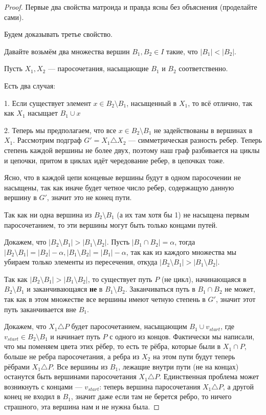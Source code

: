\begin{proof}
  Первые два свойства матроида и правда ясны без объяснения (проделайте сами).

  Будем доказывать третье свойство.

  Давайте возьмём два множества вершин $B_1, B_2 \in I$ такие, что $|B_1| < |B_2|$.

  Пусть $X_1, X_2$ --- паросочетания, насыщающие $B_1$ и $B_2$ 
  соответственно.

  Есть два случая:

  1. Если существует элемент $x \in B_2 \setminus B_1$, насыщенный в $X_1$, то всё
  отлично, так как $X_1$ насыщает $B_1 \cup x$ 

  2. Теперь мы предполагаем, что все $x \in B_2 \setminus B_1$ не задействованы
  в вершинах в $X_1$. Рассмотрим подграф $G' = X_1 \triangle X_2$ --- 
  симметрическая разность ребер. Теперь степень каждой вершины не более двух, поэтому
  наш граф разбивается на циклы и цепочки, притом в циклах идёт чередование ребер,
  в цепочках тоже.

  Ясно, что в каждой цепи концевые вершины будут в одном паросочении не насыщены, так
  как иначе будет 
  четное число ребер, содержащую данную вершину в $G'$, значит это не конец пути.

  Так как ни одна вершина из $B_2 \setminus B_1$ (а их там хотя бы 1) не насыщена
  первым паросочетанием, то эти вершины могут быть только концами путей.

  Докажем, что $|B_2 \setminus B_1| > |B_1 \setminus B_2|$. Пусть $|B_1 \cap B_2| 
  = \alpha$, тогда $|B_2 \setminus B_1| = |B_2| - \alpha, |B_1 \setminus B_2| = 
  |B_1| - \alpha$, так как из каждого множества мы убираем только элементы из 
  пересечения, откуда $|B_2 \setminus B_1| > |B_1 \setminus B_2|$.

  Так как $|B_2 \setminus B_1| > |B_1 \setminus B_2|$, то существует путь $P$ (не
  цикл),
  начинающаяся в $B_2 \setminus B_1$ и заканчивающаяся {\bf не} в $B_1 \setminus
  B_2$. Заканчиваться путь в $B_1 \cap B_2$ не может, так как в этом множестве все
  вершины имеют четную степень в $G'$, значит этот путь заканчивается вне $B_1$.

  Докажем, что $X_1 \triangle P$ будет паросочетанием, насыщающим 
  $B_1 \cup v_{start}$, где $v_{start} \in B_2 \setminus B_1$ и начинает путь 
  $P$ с одного из концов. Фактически мы написали, что мы поменяем цвета этих
  рёбер, то есть те рёбра, которые были в $X_1 \cap P$, больше не ребра паросочетания,
  а ребра из $X_2$ на этом пути будут теперь рёбрами $X_1 \triangle P$. Все вершины из
  $B_1$,
  лежащие внутри пути (не на концах) останутся быть вершинами паросочетания 
  $X_1 \triangle P$. Единственная проблема может возникнуть с концами --- $v_{start}$:
  теперь вершина паросочетания $X_1 \triangle P$, а другой конец не входил в $B_1$,
  значит даже если там не берется ребро, то ничего страшного, эта вершина нам и не
  нужна была.
\end{proof}


